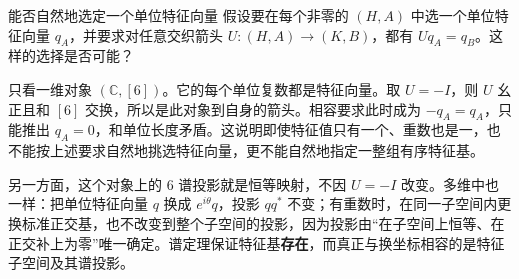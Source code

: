 \begin{example}{能否自然地选定一个单位特征向量}
假设要在每个非零的 $(H,A)$ 中选一个单位特征向量 $q_A$，并要求对任意交织箭头 $U:(H,A)\to(K,B)$，都有 $Uq_A=q_B$。这样的选择是否可能？
\end{example}
\begin{solution}
只看一维对象 $(\mathbb C,[6])$。它的每个单位复数都是特征向量。取 $U=-I$，则 $U$ 幺正且和 $[6]$ 交换，所以是此对象到自身的箭头。相容要求此时成为 $-q_A=q_A$，只能推出 $q_A=0$，和单位长度矛盾。这说明即使特征值只有一个、重数也是一，也不能按上述要求自然地挑选特征向量，更不能自然地指定一整组有序特征基。

另一方面，这个对象上的 $6$ 谱投影就是恒等映射，不因 $U=-I$ 改变。多维中也一样：把单位特征向量 $q$ 换成 $e^{i\theta}q$，投影 $qq^*$ 不变；有重数时，在同一子空间内更换标准正交基，也不改变到整个子空间的投影，因为投影由“在子空间上恒等、在正交补上为零”唯一确定。谱定理保证特征基\textbf{存在}，而真正与换坐标相容的是特征子空间及其谱投影。
\end{solution}

